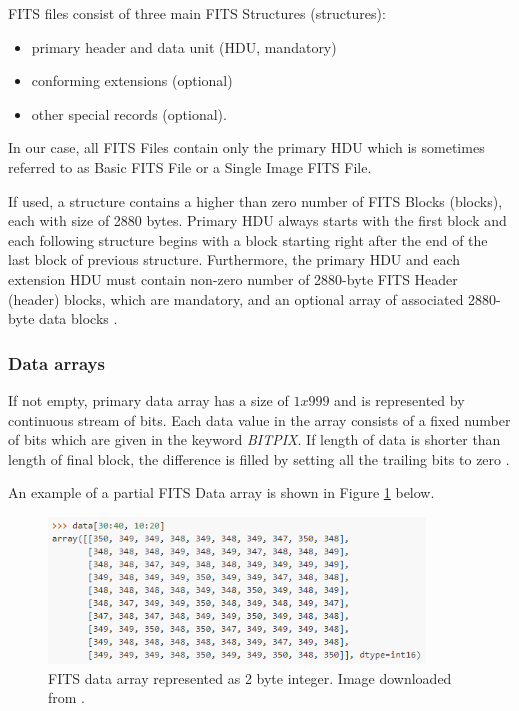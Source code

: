 	FITS files consist of three main FITS Structures (structures):
	
	\begin{itemize}
		\item primary header and data unit (HDU, mandatory)
		\item conforming extensions (optional)
		\item other special records (optional).
	\end{itemize}
	
	In our case, all FITS Files contain only the primary HDU which is sometimes referred to as Basic FITS File or a Single Image FITS File.
	
	If used, a structure contains a higher than zero number of FITS Blocks (blocks), each with size of 2880 bytes. Primary HDU always starts with the first block and each following structure begins with a block starting right after the end of the last block of previous structure. Furthermore, the primary HDU and each extension HDU must contain non-zero number of 2880-byte FITS Header (header) blocks, which are mandatory, and an optional array of associated 2880-byte data blocks \citep{FITSdefinition}.
	
\subsubsection{Data arrays} 
	
	If not empty, primary data array has a size of $1 x 999$ and is represented by continuous stream of bits. Each data value in the array consists of a fixed number of bits which are given in the keyword \emph{BITPIX}. If length of data is shorter than length of final block, the difference is filled by setting all the trailing bits to zero \citep{FITSdefinition}.
	
	An example of a partial FITS Data array is shown in Figure \ref{fig:fits_data_array} below.
	
	\begin{figure}[H]
	\centering
	  \includegraphics[width=10cm]{images/fits_data_array}
		  \caption{FITS data array represented as 2 byte integer. Image downloaded from \citep{astropy}.}
	  \label{fig:fits_data_array}
	\end{figure}
	
